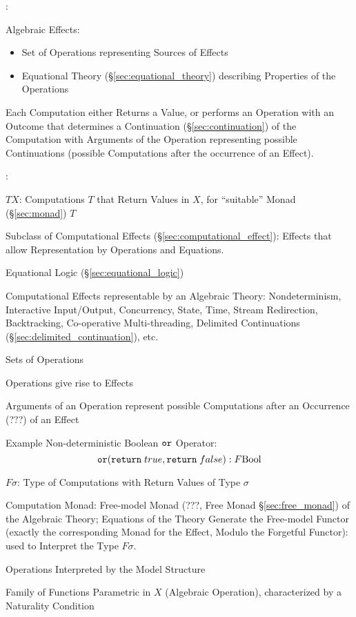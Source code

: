 \cite{plotkin-pretnar13}:

Algebraic Effects:
\begin{itemize}
  \item Set of Operations representing Sources of Effects
  \item Equational Theory (\S\ref{sec:equational_theory}) describing
    Properties of the Operations
\end{itemize}

Each Computation either Returns a Value, or performs an Operation with
an Outcome that determines a Continuation (\S\ref{sec:continuation})
of the Computation with Arguments of the Operation representing
possible Continuations (possible Computations after the occurrence of
an Effect).



\cite{plotkin-pretnar09}:

$T X$: Computations $T$ that Return Values in $X$, for ``suitable''
Monad (\S\ref{sec:monad}) $T$

Subclass of Computational Effects (\S\ref{sec:computational_effect}):
Effects that allow Representation by Operations and Equations.

Equational Logic (\S\ref{sec:equational_logic})

Computational Effects representable by an Algebraic Theory:
Nondeterminism, Interactive Input/Output, Concurrency, State, Time,
Stream Redirection, Backtracking, Co-operative Multi-threading,
Delimited Continuations (\S\ref{sec:delimited_continuation}), etc.

Sets of Operations

Operations give rise to Effects

Arguments of an Operation represent possible Computations after an
Occurrence (???) of an Effect

Example Non-deterministic Boolean $\mathtt{or}$ Operator:
\[
  \mathtt{or}(\mathtt{return}\;true, \mathtt{return}\;false)
  : F \mathrm{Bool}
\]

$F \sigma$: Type of Computations with Return Values of Type $\sigma$

Computation Monad: Free-model Monad (???, Free Monad
\S\ref{sec:free_monad}) of the Algebraic Theory; Equations of the
Theory Generate the Free-model Functor (exactly the corresponding
Monad for the Effect, Modulo the Forgetful Functor): used to Interpret
the Type $F \sigma$.

Operations Interpreted by the Model Structure

Family of Functions Parametric in $X$ (Algebraic Operation),
characterized by a Naturality Condition %


